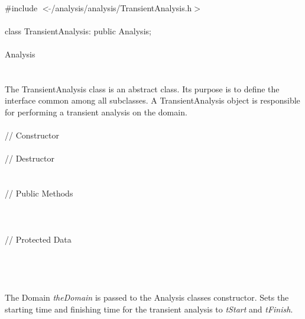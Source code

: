
   \\
\indent \#include $<\tilde{ }$/analysis/analysis/TransientAnalysis.h$>$  \\

  \\
\indent class TransientAnalysis: public Analysis;  \\

 \\
\indent Analysis \\
\indent{} \\

 \\ 
\indent The TransientAnalysis class is an abstract class. Its purpose is
to define the interface common among all subclasses. A TransientAnalysis
object is responsible for performing a transient analysis on the domain. \\


 \\
\indent // Constructor \\
\\  
\indent // Destructor \\
\\ \\
\indent // Public Methods\\
\\
\\ \\
\indent // Protected Data \\
 \\
 \\

 \\
\\  
The Domain {\em theDomain} is passed to the Analysis classes
constructor. Sets the starting time and finishing time for the
transient analysis to {\em tStart} and {\em tFinish}. \\

